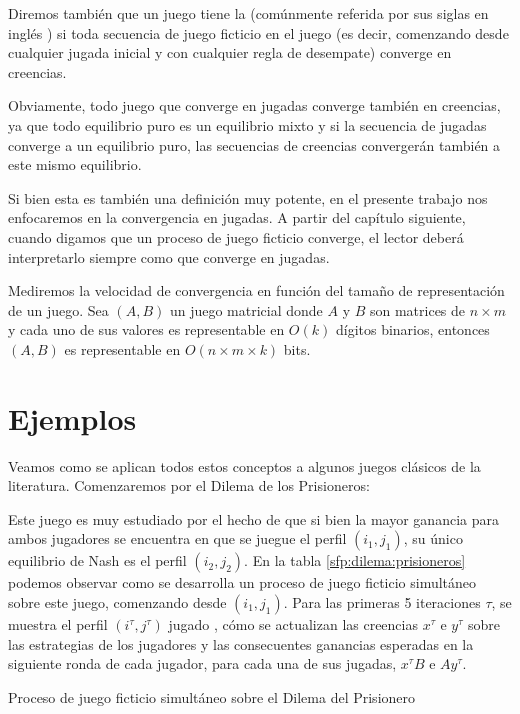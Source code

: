 Diremos también que un juego tiene la  (comúnmente referida por sus siglas en inglés ) si toda secuencia de juego ficticio en el juego (es decir, comenzando desde cualquier jugada inicial y con cualquier regla de desempate) converge en creencias.

Obviamente, todo juego que converge en jugadas converge también en creencias, ya que todo equilibrio puro es un equilibrio mixto y si la secuencia de jugadas converge a un equilibrio puro, las secuencias de creencias convergerán también a este mismo equilibrio.

Si bien esta es también una definición muy potente, en el presente trabajo nos enfocaremos en la convergencia en jugadas. A partir del capítulo siguiente, cuando digamos que un proceso de juego ficticio converge, el lector deberá interpretarlo siempre como que converge en jugadas.

Mediremos la velocidad de convergencia en función del tamaño de representación de un juego. Sea $(A, B)$ un juego matricial donde $A$ y $B$ son matrices de $n \times m$ y cada uno de sus valores es representable en $O(k)$ dígitos binarios, entonces $(A, B)$ es representable en $O(n \times m \times k)$ bits.


\section{Ejemplos}

Veamos como se aplican todos estos conceptos a algunos juegos clásicos de la literatura. Comenzaremos por el Dilema de los Prisioneros:




Este juego es muy estudiado por el hecho de que si bien la mayor ganancia para ambos jugadores se encuentra en que se juegue el perfil $(i_1, j_1)$, su único equilibrio de Nash es el perfil $(i_2, j_2)$. En la tabla \ref{sfp:dilema:prisioneros} podemos observar como se desarrolla un proceso de juego ficticio simultáneo sobre este juego, comenzando desde $(i_1, j_1)$. Para las primeras 5 iteraciones $\tau$, se muestra el perfil $(i^\tau, j^\tau)$ jugado , cómo se actualizan las creencias $x^\tau$ e $y^\tau$ sobre las estrategias de los jugadores y las consecuentes ganancias esperadas en la siguiente ronda de cada jugador, para cada una de sus jugadas, $x^\tau B$ e $A y^\tau$.

\begin{table} %
    \centering
    
    \caption{Proceso de juego ficticio simultáneo sobre el Dilema del Prisionero}
    \label{sfp:dilema:prisioneros}
\end{table}

